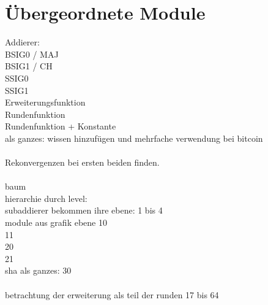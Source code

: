 \section{Übergeordnete Module}
\label{sec:knf:module}


Addierer:\\
BSIG0 / MAJ\\
BSIG1 / CH\\
SSIG0\\
SSIG1\\
Erweiterungsfunktion\\
Rundenfunktion\\
Rundenfunktion + Konstante\\
 als ganzes: wissen hinzufügen und mehrfache verwendung bei bitcoin\\
~\\
Rekonvergenzen bei ersten beiden finden.\\
~\\
baum\\
hierarchie durch level:\\
subaddierer bekommen ihre ebene: 1 bis 4\\
module aus grafik ebene 10\\
11\\
20\\
21\\
sha als ganzes: 30\\
~\\
betrachtung der erweiterung als teil der runden 17 bis 64